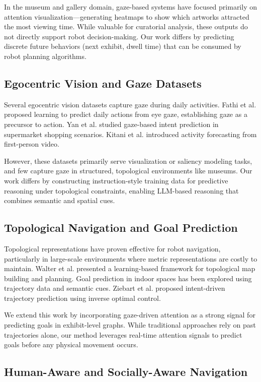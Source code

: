 \documentclass[letterpaper]{article}
\begin{document}
In the museum and gallery domain, gaze-based systems have focused primarily on attention visualization—generating heatmaps to show which artworks attracted the most viewing time. While valuable for curatorial analysis, these outputs do not directly support robot decision-making. Our work differs by predicting discrete future behaviors (next exhibit, dwell time) that can be consumed by robot planning algorithms.

\subsection{Egocentric Vision and Gaze Datasets}

Several egocentric vision datasets capture gaze during daily activities. Fathi et al. proposed learning to predict daily actions from eye gaze, establishing gaze as a precursor to action. Yan et al. studied gaze-based intent prediction in supermarket shopping scenarios. Kitani et al. introduced activity forecasting from first-person video.

However, these datasets primarily serve visualization or saliency modeling tasks, and few capture gaze in structured, topological environments like museums. Our work differs by constructing instruction-style training data for predictive reasoning under topological constraints, enabling LLM-based reasoning that combines semantic and spatial cues.

\subsection{Topological Navigation and Goal Prediction}

Topological representations have proven effective for robot navigation, particularly in large-scale environments where metric representations are costly to maintain. Walter et al. presented a learning-based framework for topological map building and planning. Goal prediction in indoor spaces has been explored using trajectory data and semantic cues. Ziebart et al. proposed intent-driven trajectory prediction using inverse optimal control.

We extend this work by incorporating gaze-driven attention as a strong signal for predicting goals in exhibit-level graphs. While traditional approaches rely on past trajectories alone, our method leverages real-time attention signals to predict goals before any physical movement occurs.

\subsection{Human-Aware and Socially-Aware Navigation}
\end{document}
